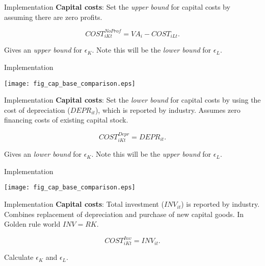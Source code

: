 \documentclass[10pt,xcolor=dvipsnames]{beamer}
\begin{document}
\begin{frame}{Implementation}
\textbf{Capital costs}: Set the \textit{upper bound} for capital costs by assuming there are zero profits.

\begin{equation}
  COST_{iKt}^{NoProf} = VA_i - COST_{iLt}.
\end{equation}

Gives an \textit{upper bound} for $\epsilon_K$. Note this will be the \textit{lower bound} for $\epsilon_L$.

\end{frame}

\begin{frame}{Implementation}
\begin{center}
\texttt{[image: fig\_cap\_base\_comparison.eps]}
\end{center}
\end{frame}

\begin{frame}{Implementation}
\textbf{Capital costs}: Set the \textit{lower bound} for capital costs by using the cost of depreciation ($DEPR_{it}$), which is reported by industry. Assumes zero financing costs of existing capital stock.

\begin{equation}
  COST_{iKt}^{Depr} = DEPR_{it}.
\end{equation}

Gives an \textit{lower bound} for $\epsilon_K$. Note this will be the \textit{upper bound} for $\epsilon_L$.

\end{frame}

\begin{frame}{Implementation}
\begin{center}
\texttt{[image: fig\_cap\_base\_comparison.eps]}
\end{center}
\end{frame}

\begin{frame}{Implementation}
\textbf{Capital costs}: Total investment ($INV_{it}$) is reported by industry. Combines replacement of depreciation and purchase of new capital goods. In Golden rule world $INV = RK$. 

\begin{equation}
  COST_{iKt}^{Inv} = INV_{it}.
\end{equation}

Calculate $\epsilon_K$ and $\epsilon_L$. 

\end{frame}
\end{document}
